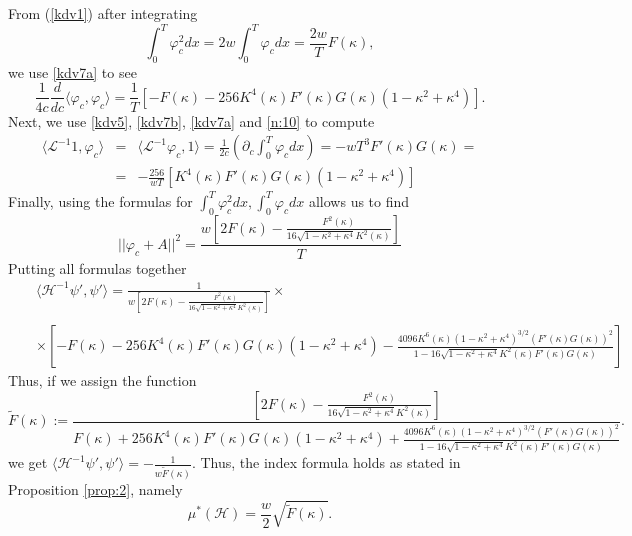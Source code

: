 \documentclass[final,11pt,leqno]{amsart}
\begin{document}
  From (\ref{kdv1}) after integrating
  $$
  \int_0^T {\varphi}_c^2 dx=2w\int_{0}^{T}{{\varphi}_c}dx={\frac{2w}{T}}F(\kappa),
  $$
  we use \eqref{kdv7a} to see
  \begin{equation}
  \label{kdv10}
  \frac{1}{4c}\frac{d}{dc}\langle \varphi_c,
    \varphi_c\rangle = {\frac{1}{T}}\left[
    -F(\kappa)-256K^4(\kappa)F'(\kappa)G(\kappa)(1-\kappa^2+\kappa^4)\right].
    \end{equation}
Next,  we use \eqref{kdv5}, \eqref{kdv7b}, \eqref{kdv7a} and \eqref{n:10} to compute
    \begin{eqnarray*}
      \langle {\mathcal L}^{-1}1, \varphi_c\rangle &=& \langle
      {\mathcal L}^{-1}\varphi_c,1\rangle= {\frac{{1}}{{2c}}}({\partial}_c\int_0^T {\varphi}_c dx)= -wT^3F'(\kappa)G(\kappa)= \\
      &=& {-\frac{256}{wT}}[ K^4(\kappa)F'(\kappa)G(\kappa)(1-\kappa^2+\kappa^4)]
      \end{eqnarray*}
Finally,  using the formulas for $\int_0^T {\varphi}_c^2 dx, \int_0^T {\varphi}_c dx$ allows us to find
      $$
 ||\varphi_c+A||^2 = {\frac{w\left[
       2F(\kappa)-{\frac{F^2(\kappa)}{16\sqrt{1-\kappa^2+\kappa^4}K^2(\kappa)}}\right]}{T}}
    $$
 Putting all formulas together
     \begin{eqnarray*}
      & &  \langle {\mathcal H}^{-1}\psi', \psi'\rangle={\frac{1}{w\left[
       2F(\kappa)-{\frac{F^2(\kappa)}{16\sqrt{1-\kappa^2+\kappa^4}K^2(\kappa)}}\right]}} \times    \\
       \\
     & & \times \left[-F(\kappa)-256K^4(\kappa)F'(\kappa)G(\kappa)(1-\kappa^2+\kappa^4)-{\frac{{4096 K^6({\kappa})(1-{\kappa}^2+{\kappa}^4)^{3/2}(F'({\kappa}) G({\kappa}))^2}}{{1-16\sqrt{1-\kappa^2+\kappa^4}K^2(\kappa)F'(\kappa)G(\kappa)}}}\right]
     \end{eqnarray*}
     Thus, if we assign the function
     \begin{equation}
     \label{i:1}
     \tilde{F}(\kappa):={\frac{{\left[
       2F(\kappa)-{\frac{F^2(\kappa)}{16\sqrt{1-\kappa^2+\kappa^4}K^2(\kappa)}}\right] }}{{ F(\kappa)+256K^4(\kappa)F'(\kappa)G(\kappa)(1-\kappa^2+\kappa^4)+{\frac{{4096 K^6({\kappa})(1-{\kappa}^2+{\kappa}^4)^{3/2}(F'({\kappa}) G({\kappa}))^2}}{{1-16\sqrt{1-\kappa^2+\kappa^4}K^2(\kappa)F'(\kappa)G(\kappa)}}}}}}.
\end{equation}
 we get
     $\langle {\mathcal H}^{-1}\psi', \psi'\rangle=-\frac{1}{w\tilde{F}(\kappa)} $. Thus, the index formula holds as stated in Proposition \ref{prop:2}, namely
     $$
     \mu^*({\mathcal H})={\frac{{w}}{{2}}}\sqrt{\tilde{F}({\kappa})}.
     $$
\end{document}
